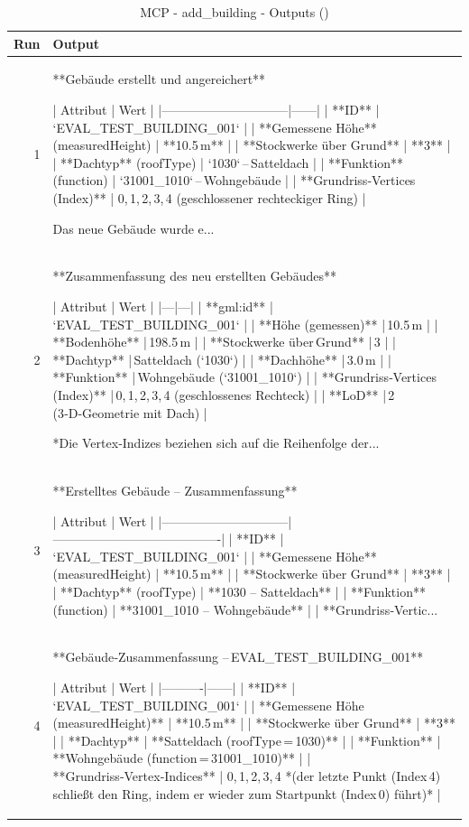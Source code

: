 \documentclass[a4paper,11pt]{article}
\begin{document}
\begin{table}[ht]
\centering
\scriptsize
\caption{MCP - add\_building - Outputs ()}
\label{tab:mcp\_add\_building\_outputs\_}
\begin{tabular}{r p{12cm}}
\hline
Run & Output \\
\hline
1 & **Gebäude erstellt und angereichert**

| Attribut                     | Wert |
|------------------------------|------|
| **ID**                       | `EVAL\_TEST\_BUILDING\_001` |
| **Gemessene Höhe** (measuredHeight) | **10.5 m** |
| **Stockwerke über Grund**    | **3** |
| **Dachtyp** (roofType)       | `1030` – Satteldach |
| **Funktion** (function)      | `31001\_1010` – Wohngebäude |
| **Grundriss‑Vertices (Index)** | 0, 1, 2, 3, 4 (geschlossener rechteckiger Ring) |

Das neue Gebäude wurde e... \\
2 & **Zusammenfassung des neu erstellten Gebäudes**

| Attribut | Wert |
|---|---|
| **gml:id** | `EVAL\_TEST\_BUILDING\_001` |
| **Höhe (gemessen)** | 10.5 m |
| **Bodenhöhe** | 198.5 m |
| **Stockwerke über Grund** | 3 |
| **Dachtyp** | Satteldach (`1030`) |
| **Dachhöhe** | 3.0 m |
| **Funktion** | Wohngebäude (`31001\_1010`) |
| **Grundriss‑Vertices (Index)** | 0, 1, 2, 3, 4 (geschlossenes Rechteck) |
| **LoD** | 2 (3‑D‑Geometrie mit Dach) |

*Die Vertex‑Indizes beziehen sich auf die Reihenfolge der... \\
3 & **Erstelltes Gebäude – Zusammenfassung**

| Attribut                     | Wert                                   |
|------------------------------|----------------------------------------|
| **ID**                       | `EVAL\_TEST\_BUILDING\_001`                |
| **Gemessene Höhe** (measuredHeight) | **10.5 m** |
| **Stockwerke über Grund**    | **3** |
| **Dachtyp** (roofType)       | **1030 – Satteldach** |
| **Funktion** (function)      | **31001\_1010 – Wohngebäude** |
| **Grundriss‑Vertic... \\
4 & **Gebäude‑Zusammenfassung – EVAL\_TEST\_BUILDING\_001**

| Attribut | Wert |
|----------|------|
| **ID** | `EVAL\_TEST\_BUILDING\_001` |
| **Gemessene Höhe (measuredHeight)** | **10.5 m** |
| **Stockwerke über Grund** | **3** |
| **Dachtyp** | **Satteldach (roofType = 1030)** |
| **Funktion** | **Wohngebäude (function = 31001\_1010)** |
| **Grundriss‑Vertex‑Indices** | 0, 1, 2, 3, 4 *(der letzte Punkt (Index 4) schließt den Ring, indem er wieder zum Startpunkt (Index 0) führt)* |


\end{tabular}
\end{table}
\end{document}
